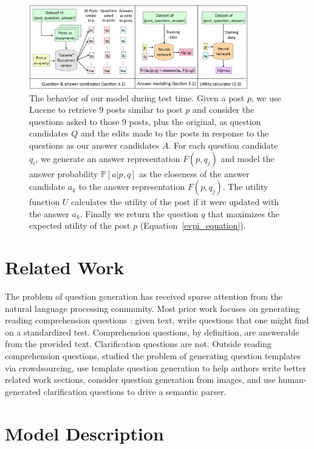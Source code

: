 \documentclass[11pt,a4paper]{article}
\begin{document}
\begin{figure}[t]
	\centering
	\includegraphics[width=0.85\textwidth]{model}
	\caption{\small The behavior of our model during test time. Given a post $p$, we use Lucene to retrieve 9 posts similar to post $p$ and consider the questions asked to those 9 posts, plus the original, as question candidates $Q$ and the edits made to the posts in response to the questions as our answer candidates $A$. For each question candidate $q_i$, we generate an answer representation $F(p,q_j)$ and model the answer probability $\mathbb{P}[a | p,q]$ as the closeness of the answer candidate $a_k$ to the answer representation $F(p,q_j)$. The utility function $U$ calculates the utility of the post if it were updated with the answer $a_k$. Finally we return the question $q$ that maximizes the expected utility of the post $p$ (Equation~\ref{evpi_equation}).}
	\label{model}
\end{figure}

\section{Related Work}
The problem of question generation has received sparse attention from the natural language processing community. Most prior work focuses on generating reading comprehension questions \cite{vanderwende2008importance,penas2010filling,heilman2011automatic}: given text, write questions that one might find on a standardized test. Comprehension questions, by definition, are answerable from the provided text. Clarification questions are not. Outside reading comprehension questions,  studied the problem of generating question templates via crowdsourcing,  use template question generation to help authors write better related work sections,  consider question generation from images, and   use human-generated clarification questions to drive a semantic parser.

\section{Model Description}\label{model_description}
\end{document}
